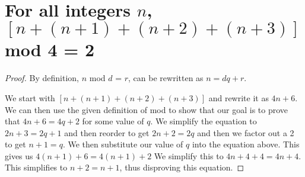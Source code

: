 \documentclass[12pt]{article}
\begin{document}
\section*{For all integers $n$,$[n+(n+1)+(n+2)+(n+3)]$ mod 4 = 2}
\begin{proof} %
By definition, $n$ mod $d$ = $r$, can be rewritten as $n = dq + r$.

We start with $[n+(n+1)+(n+2)+(n+3)]$ and rewrite it as $4n+6$.
We can then use the given definition of mod to show that our goal is
to prove that $4n + 6 = 4q+2$ for some value of $q$.
We simplify the equation to $2n + 3 = 2q + 1$ and then reorder to get
$2n + 2 = 2q$ and then we factor out a 2 to get $n + 1 = q$. We then substitute our value of
$q$ into the equation above. This gives us $4(n +1) +6 = 4(n+1) + 2$
We simplify this to $4n + 4 + 4 = 4n + 4$.
This simplifies to $n + 2 = n + 1$, thus disproving this equation.
\end{proof}
\end{document}
